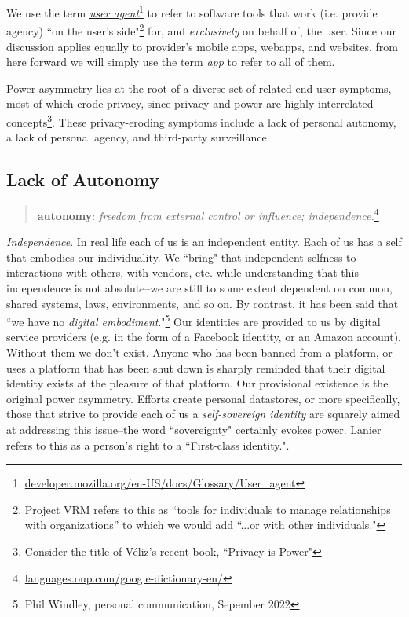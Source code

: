\documentclass[11pt, oneside]{article}   	%
\newcommand{\hyperfootnote}[1][]{\def\ArgI{{#1}}\hyperfootnoteRelay}
\newcommand\hyperfootnoteRelay[2][]{\href{#1#2}{\ArgI}\footnote{\href{#1#2}{#2}}}
\begin{document}
We use the term \hyperfootnote[\emph{user agent}][https://]{developer.mozilla.org/en-US/docs/Glossary/User\_agent} to refer to software tools that work (i.e. provide agency) ``on the user's side"\footnote{Project VRM refers to this as ``tools for individuals to manage relationships with organizations'' to which we would add ``...or with other individuals."} for, and \emph{exclusively} on behalf of, the user. Since our discussion applies equally to provider's mobile apps, webapps, and websites, from here forward we will simply use the term \emph{app} to refer to all of them.

Power asymmetry lies at the root of a diverse set of related end-user symptoms, most of which erode privacy, since privacy and power are highly interrelated concepts\footnote{Consider the title of V\'eliz's recent book, ``Privacy is Power"\cite{veliz2020}}. 
These privacy-eroding symptoms include a lack of personal autonomy, a lack of personal agency, and third-party surveillance. 

\subsection{Lack of Autonomy}

\begin{quote}
\textbf{au\hspace{0.5mm}\tiny {}\normalsize \hspace{0.5mm}ton\hspace{0.5mm}\tiny {}\normalsize \hspace{0.5mm}o\hspace{0.5mm}\tiny {}\normalsize \hspace{0.5mm}my}: \emph{freedom from external control or influence; independence.}\hyperfootnote[][https://]{languages.oup.com/google-dictionary-en/}
\end{quote}

\emph{Independence}. In real life each of us is an independent entity. Each of us has a self that embodies our individuality. We ``bring" that independent selfness to interactions with others, with vendors, etc. while understanding that this independence is not absolute--we are still to some extent dependent on common, shared systems, laws, environments, and so on. By contrast, it has been said that ``we have no \emph{digital embodiment}."\footnote{Phil Windley, personal communication, Sepember 2022}  Our identities are provided to us by digital service providers (e.g. in the form of a Facebook identity, or an Amazon account). Without them we don't exist. Anyone who has been banned from a platform, or uses a platform that has been shut down is sharply reminded that their digital identity exists at the pleasure of that platform. Our provisional existence is the original power asymmetry. Efforts create personal datastores, or more specifically, those that strive to provide each of us a \emph{self-sovereign identity}\cite{Preukschat2021} are squarely aimed at addressing this issue--the word ``sovereignty" certainly evokes power. Lanier refers to this as a person's right to a ``First-class identity."\cite[p251]{Lanier2014}.
\end{document}
